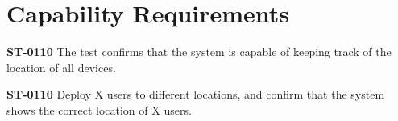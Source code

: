 \section{Capability Requirements}
\textbf{ST-0110} The test confirms that the system is capable of keeping track of the location of all devices.

\textbf{ST-0110} Deploy X users to different locations, and confirm that the system shows the correct location of X users.